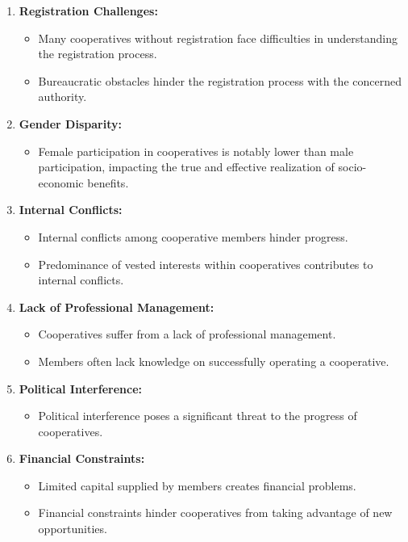 \begin{enumerate}
    \item \textbf{Registration Challenges:}
        \begin{itemize}
            \item Many cooperatives without registration face difficulties in understanding the registration process.
            \item Bureaucratic obstacles hinder the registration process with the concerned authority.
        \end{itemize}
    
    \item \textbf{Gender Disparity:}
        \begin{itemize}
            \item Female participation in cooperatives is notably lower than male participation, impacting the true and effective realization of socio-economic benefits.
        \end{itemize}
    
    \item \textbf{Internal Conflicts:}
        \begin{itemize}
            \item Internal conflicts among cooperative members hinder progress.
            \item Predominance of vested interests within cooperatives contributes to internal conflicts.
        \end{itemize}
    
    \item \textbf{Lack of Professional Management:}
        \begin{itemize}
            \item Cooperatives suffer from a lack of professional management.
            \item Members often lack knowledge on successfully operating a cooperative.
        \end{itemize}
    
    \item \textbf{Political Interference:}
        \begin{itemize}
            \item Political interference poses a significant threat to the progress of cooperatives.
        \end{itemize}
    
    \item \textbf{Financial Constraints:}
        \begin{itemize}
            \item Limited capital supplied by members creates financial problems.
            \item Financial constraints hinder cooperatives from taking advantage of new opportunities.
        \end{itemize}
    

\end{enumerate}
